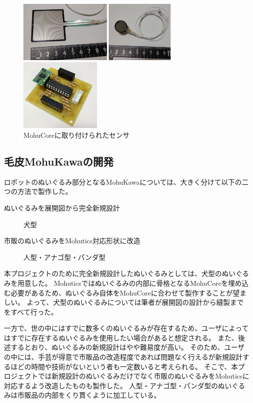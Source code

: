 \documentclass[uplatex,a4paper,12pt]{jsarticle}
\begin{document}
\begin{figure}[htbp]
  \centering
  \begin{minipage}[c]{0.64\linewidth}
    \centering
    \includegraphics[keepaspectratio,width=8cm,clip]{images/mohucore/touch_sensor.png}
  \end{minipage}
  \begin{minipage}[c]{0.32\linewidth}
    \centering
    \includegraphics[keepaspectratio,width=4cm,clip]{images/mohucore/sensor_board.jpg}
  \end{minipage}
  \caption{MohuCoreに取り付けられたセンサ}
  \label{fig:mohucore:sensor}
\end{figure}


\subsection{毛皮MohuKawaの開発}

ロボットのぬいぐるみ部分となるMohuKawaについては、大きく分けて以下の二つの方法で製作した。
\begin{description}
  \item[ぬいぐるみを展開図から完全新規設計]犬型
  \item[市販のぬいぐるみをMohutics対応形状に改造]人型・アナゴ型・パンダ型  
\end{description}

本プロジェクトのために完全新規設計したぬいぐるみとしては、犬型のぬいぐるみを用意した。
Mohuticsではぬいぐるみの内部に骨格となるMohuCoreを埋め込む必要があるため、ぬいぐるみ自体をMohuCoreに合わせて製作することが望ましい。
よって、犬型のぬいぐるみについては筆者が展開図の設計から縫製までをすべて行った。

一方で、世の中にはすでに数多くのぬいぐるみが存在するため、ユーザによってはすでに存在するぬいぐるみを使用したい場合があると想定される。
また、後述するとおり、ぬいぐるみの新規設計はやや難易度が高い。
そのため、ユーザの中には、手芸が得意で市販品の改造程度であれば問題なく行えるが新規設計するほどの時間や技術がないという者も一定数いると考えられる。
そこで、本プロジェクトでは新規設計のぬいぐるみだけでなく市販のぬいぐるみをMohuticsに対応するよう改造したものも製作した。
人型・アナゴ型・パンダ型のぬいぐるみは市販品の内部をくり貫くように加工している。
\end{document}
